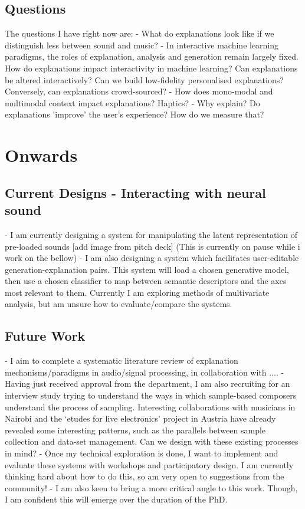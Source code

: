 \documentclass[../main.tex]{subfiles}
\begin{document}
\subsection{Questions}
The questions I have right now are:
- What do explanations look like if we distinguish less between sound and music? 
- In interactive machine learning paradigms, the roles of explanation, analysis and generation remain largely fixed. How do explanations impact interactivity in machine learning? Can explanations be altered interactively? Can we build low-fidelity personalised explanations? Conversely, can explanations crowd-sourced?
- How does mono-modal and multimodal context impact explanations? Haptics?
- Why explain? Do explanations 'improve' the user's experience? How do we measure that?

\section{Onwards}

\subsection{Current Designs - Interacting with neural sound}
- I am currently designing a system for manipulating the latent representation of pre-loaded sounds [add image from pitch deck] (This is currently on pause while i work on the bellow)
- I am also designing a system which facilitates user-editable generation-explanation pairs. This system will load a chosen generative model, then use a chosen classifier to map between semantic descriptors and the axes most relevant to them. Currently I am exploring methods of multivariate analysis, but am unsure how to evaluate/compare the systems.

\subsection{Future Work}
- I aim to complete a systematic literature review of explanation mechanisms/paradigms in audio/signal processing, in collaboration with ....
- Having just received approval from the department, I am also recruiting for an interview study trying to understand the ways in which sample-based composers understand the process of sampling. Interesting collaborations with musicians in Nairobi and the `etudes for live electronics' project in Austria have already revealed some interesting patterns, such as the parallels between sample collection and data-set management. Can we design with these existing processes in mind?
- Once my technical exploration is done, I want to implement and evaluate these systems with workshops and participatory design. I am currently thinking hard about how to do this, so am very open to suggestions from the community!
- I am also keen to bring a more critical angle to this work. Though, I am confident this will emerge over the duration of the PhD.

\printbibliography
\end{document}
